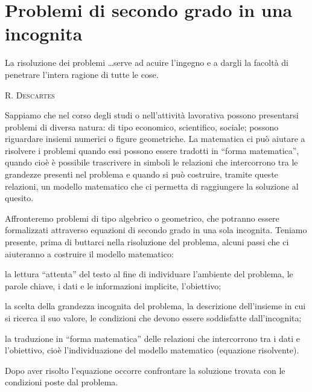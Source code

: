 % 

\section{Problemi di secondo grado in una incognita}
\label{sec:eq2gr_problemi}

 \epigraph{La risoluzione dei problemi \ldots serve ad acuire l'ingegno e a 
dargli la facoltà di penetrare
 l'intera ragione di tutte le cose.}{{\scshape{R. Descartes}}}

Sappiamo che nel corso degli studi o nell'attività lavorativa possono 
presentarsi problemi di diversa natura: di tipo economico, scientifico, 
sociale; possono riguardare insiemi numerici o figure geometriche. La 
matematica ci può aiutare a risolvere i problemi quando essi possono essere 
tradotti in ``forma matematica'', quando cioè è possibile trascrivere in 
simboli le relazioni che intercorrono tra le grandezze presenti nel problema 
e quando si può costruire, tramite queste relazioni, un modello matematico 
che ci permetta di raggiungere la soluzione al quesito.

Affronteremo problemi di tipo algebrico o geometrico, che potranno essere 
formalizzati attraverso equazioni di secondo grado in una sola incognita.
Teniamo presente, prima di buttarci nella risoluzione del problema, alcuni 
passi che ci aiuteranno a costruire il modello matematico:
\begin{itemize*}
\item la lettura ``attenta'' del testo al fine di individuare l'ambiente del 
problema, le parole chiave, i dati e le informazioni implicite, l'obiettivo;
\item la scelta della grandezza incognita del problema, la descrizione 
dell'insieme in cui si ricerca il suo valore, le condizioni che devono essere 
soddisfatte dall'incognita;
\item la traduzione in ``forma matematica'' delle relazioni che intercorrono 
tra i dati e l'obiettivo, cioè l'individuazione del modello matematico 
(equazione risolvente).
\end{itemize*}
Dopo aver risolto l'equazione occorre confrontare la soluzione trovata con le 
condizioni poste dal problema.

